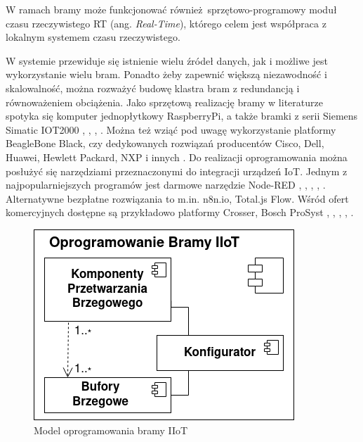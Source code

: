 \documentclass[a4paper, 12pt, twoside]{article}
\begin{document}
W ramach bramy może funkcjonować również sprzętowo-programowy moduł
czasu rzeczywistego RT (ang. \emph{Real-Time}), którego celem jest współpraca
z lokalnym systemem czasu rzeczywistego.

W systemie przewiduje się istnienie wielu źródeł
danych, jak i możliwe jest wykorzystanie wielu bram. Ponadto żeby zapewnić
większą niezawodność i skalowalność,
można rozważyć budowę klastra bram z redundancją i równoważeniem obciążenia.
Jako sprzętową realizację bramy w literaturze spotyka się komputer jednopłytkowy
RaspberryPi, a także bramki z serii Siemens Simatic IOT2000
\cite{iiot-opensource-gateway}, \cite{design-impl-node-gateway},
\cite{low-cost-esp32-pi-node-red-scada}, \cite{modbus-iot-gateway}. Można też
wziąć pod uwagę wykorzystanie platformy BeagleBone Black, czy dedykowanych rozwiązań
producentów Cisco, Dell, Huawei, Hewlett Packard, NXP i innych \cite{gateways}.
Do realizacji oprogramowania można posłużyć się narzędziami przeznaczonymi do
integracji urządzeń IoT. Jednym z najpopularniejszych programów jest
darmowe narzędzie Node-RED \cite{flow-programming}, \cite{iot-gateway-medical-and-industrial},
\cite{design-impl-node-gateway}, \cite{iiot-opensource-gateway}, \cite{low-cost-esp32-pi-node-red-scada}.
Alternatywne bezpłatne rozwiązania to m.in. n8n.io, Total.js Flow.
Wśród ofert komercyjnych dostępne są przykładowo platformy Crosser, Bosch ProSyst
\cite{node-red}, \cite{n8n}, \cite{total-js-flow}, \cite{crosser}, \cite{gateways}.

\begin{figure}
      \centering
      \includegraphics[scale=0.4]{oprog_bramy.png}
      \caption{Model oprogramowania bramy IIoT}
      \label{fig:gateway_soft}
\end{figure}
\end{document}
